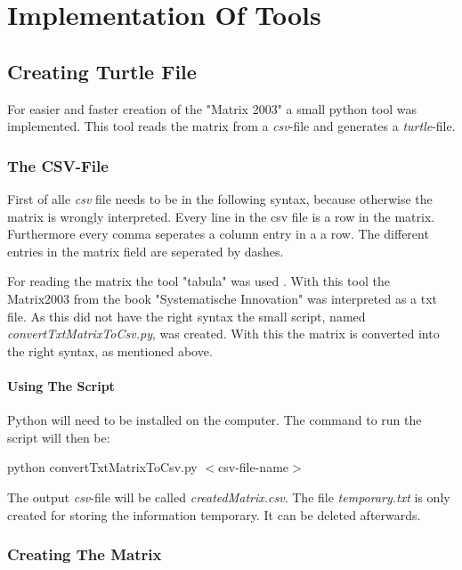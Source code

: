 \section{Implementation Of Tools}

\subsection{Creating Turtle File}

For easier and faster creation of the "Matrix 2003" a small python tool was implemented.
This tool reads the matrix from a \textit{csv}-file and generates a \textit{turtle}-file.

\subsubsection{The CSV-File}

First of alle \textit{csv} file needs to be in the following syntax, because otherwise the matrix is wrongly interpreted.
Every line in the csv file is a row in the matrix.
Furthermore every comma seperates a column entry in a a row.
The different entries in the matrix field are seperated by dashes.

For reading the matrix the tool "tabula" was used \cite{tabula}.
With this tool the Matrix2003 from the book "Systematische Innovation" was interpreted as a txt file.
As this did not have the right syntax the small script, named \textit{convertTxtMatrixToCsv.py}, was created. 
With this the matrix is converted into the right syntax, as mentioned above.

\paragraph{Using The Script}

Python will need to be installed on the computer. 
The command to run the script will then be:

\begin{center}
    python convertTxtMatrixToCsv.py $<$csv-file-name$>$
\end{center}

The output \textit{csv}-file will be called \textit{createdMatrix.csv}.
The file \textit{temporary.txt} is only created for storing the information temporary. 
It can be deleted afterwards.

\subsubsection{Creating The Matrix}
\label{subsubsec:creating_matrix}

